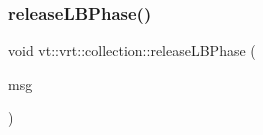 \mbox{\label{namespacevt_1_1vrt_1_1collection_a2c79a9043914424ca6d19bdbdc496bbf}} 
\subsubsection{\texorpdfstring{release\+L\+B\+Phase()}{releaseLBPhase()}}
{\footnotesize\ttfamily void vt\+::vrt\+::collection\+::release\+L\+B\+Phase (\begin{DoxyParamCaption}\item[{\hyperlink{structvt_1_1vrt_1_1collection_1_1_collection_phase_msg}{Collection\+Phase\+Msg} $\ast$}]{msg }\end{DoxyParamCaption})}

